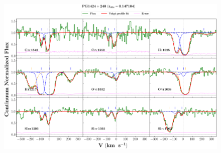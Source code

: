 \documentclass[12pt]{report}
\begin{document}
\begin{landscape}

    \begin{figure}
    \centering
    \vspace{-20mm}
    \hspace*{-35mm}
    \includegraphics[width=1.25\linewidth]{System-Plots/PG1424+240_z=0.147104_sys_plot.png}
    \end{figure}
    
\end{landscape}
\end{document}

